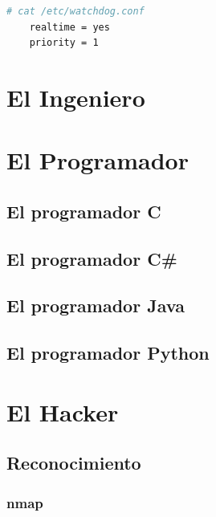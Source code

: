 \documentclass[a4paper, 11pt, titlepage]{book}
\begin{document}
        \begin{lstlisting}[language=bash]
    # cat /etc/watchdog.conf
    realtime = yes
    priority = 1\end{lstlisting}

\chapter{El Ingeniero}

\chapter{El Programador}

    \section{El programador C}

    \section{El programador C\#}

    \section{El programador Java}

    \section{El programador Python}

\chapter{El Hacker}

    \section{Reconocimiento}
            
        \subsection{nmap}

\end{document}
